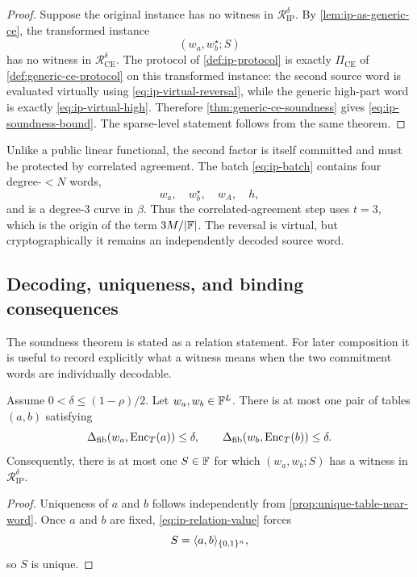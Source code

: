\begin{proof}
Suppose the original instance has no witness in $\mathcal R^{\delta}_{\mathrm{IP}}$.  By \cref{lem:ip-as-generic-ce}, the transformed instance
\[
  (w_a,w_b^{\star};S)
\]
has no witness in $\mathcal R^{\delta}_{\mathrm{CE}}$.  The protocol of \cref{def:ip-protocol} is exactly $\Pi_{\mathrm{CE}}$ of \cref{def:generic-ce-protocol} on this transformed instance: the second source word is evaluated virtually using \eqref{eq:ip-virtual-reversal}, while the generic high-part word is exactly \eqref{eq:ip-virtual-high}.  Therefore \cref{thm:generic-ce-soundness} gives \eqref{eq:ip-soundness-bound}.  The sparse-level statement follows from the same theorem.
\end{proof}

\begin{remark}
\label{rem:ip-three-M}
Unlike a public linear functional, the second factor is itself committed and must be protected by correlated agreement.  The batch \eqref{eq:ip-batch} contains four degree-$<N$ words,
\[
  w_a,\quad w_b^{\star},\quad w_A,\quad h,
\]
and is a degree-$3$ curve in $\beta$.  Thus the correlated-agreement step uses $t=3$, which is the origin of the term $3M/|\mathbb{F}|$.  The reversal is virtual, but cryptographically it remains an independently decoded source word.
\end{remark}

\subsection{Decoding, uniqueness, and binding consequences}
\label{sec:ip-decoding}

The soundness theorem is stated as a relation statement.  For later composition it is useful to record explicitly what a witness means when the two commitment words are individually decodable.

\begin{proposition}
\label{prop:ip-decoded-value-unique}
Assume $0<\delta\le(1-\rho)/2$.  Let $w_a,w_b\in\mathbb{F}^L$.  There is at most one pair of tables $(a,b)$ satisfying
\[
  \Delta_{\mathrm{fib}}(w_a,\operatorname{Enc}_T(a))\le\delta,
  \qquad
  \Delta_{\mathrm{fib}}(w_b,\operatorname{Enc}_T(b))\le\delta.
\]
Consequently, there is at most one $S\in\mathbb{F}$ for which $(w_a,w_b;S)$ has a witness in $\mathcal R^{\delta}_{\mathrm{IP}}$.
\end{proposition}

\begin{proof}
Uniqueness of $a$ and $b$ follows independently from \cref{prop:unique-table-near-word}.  Once $a$ and $b$ are fixed, \eqref{eq:ip-relation-value} forces
\[
  S=\langle a,b\rangle_{\{0,1\}^n},
\]
so $S$ is unique.
\end{proof}

